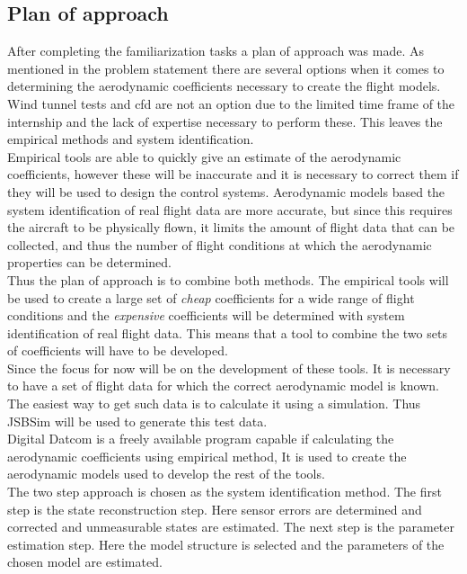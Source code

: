 \subsection{Plan of approach}
After completing the familiarization tasks a plan of approach was made. As mentioned in the problem statement there are several options when it comes to determining the aerodynamic coefficients necessary to create the flight models. Wind tunnel tests and \gls{cfd} are not an option due to the limited time frame of the internship and the lack of expertise necessary to perform these. This leaves the empirical methods and system identification. \\

Empirical tools are able to quickly give an estimate of the aerodynamic coefficients, however these will be inaccurate and it is necessary to correct them if they will be used to design the control systems. Aerodynamic models based the system identification of real flight data are more accurate, but since this requires the aircraft to be physically flown, it limits the amount of flight data that can be collected, and thus the number of flight conditions at which the aerodynamic properties can be determined. \\

Thus the plan of approach is to combine both methods. The empirical tools will be used to create a large set of \textit{cheap} coefficients for a wide range of flight conditions and the \textit{expensive} coefficients will be determined with system identification of real flight data. This means that a tool to combine the two sets of coefficients will have to be developed.\\

Since the focus for now will be on the development of these tools. It is necessary to have a set of flight data for which the correct aerodynamic model is known. The easiest way to get such data is to calculate it using a simulation. Thus JSBSim will be used to generate this test data.\\

Digital Datcom is a freely available program capable if calculating the aerodynamic coefficients using empirical method, It is used to create the aerodynamic models used to develop the rest of the tools.\\

The two step approach is chosen as the system identification method. The first step is the state reconstruction step. Here sensor errors are determined and corrected and unmeasurable states are estimated. The next step is the parameter estimation step. Here the model structure is selected and the parameters of the chosen model are estimated.\\


